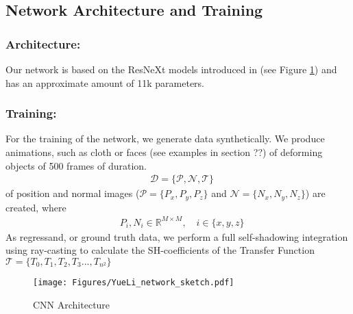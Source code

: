 \subsection{ Network Architecture and Training}
\subsubsection*{Architecture: } Our network is based on the ResNeXt models introduced in \cite{ResNeXt} (see Figure \ref{Fig: CNN_Architecture}) and has an approximate amount of  11k parameters.
\\
 
\subsubsection*{Training: }
For the training of the network, we generate data synthetically. We produce animations, such as cloth or faces (see examples in section ??) of deforming objects of 500 frames of duration. 
\begin{align*}
&\mathcal{D} = \{  \mathcal{P} , \mathcal{N} , \mathcal{T}\} 
\end{align*}
of position and normal images ($\mathcal{P}= \{ P_x , P_y, P_z \} $  and $\mathcal{N}= \{ N_x , N_y, N_z \} $) are created, where 
\begin{align*}
&P_i,N_i \in \mathbb{R}^{M \times M} ,
\quad
i \in \{x,y,z\}
\end{align*}
As regressand, or ground truth data,  we perform a full self-shadowing integration using ray-casting to calculate the SH-coefficients of the Transfer Function $\mathcal{T}= \{ T_0 , T_1, T_2, T_3..., T_{n^2} \} $ 

\begin{figure}[H]
  \centering
    \texttt{[image: Figures/YueLi\_network\_sketch.pdf]}
     \caption{CNN Architecture}
     \label{Fig: CNN_Architecture}
\end{figure}




